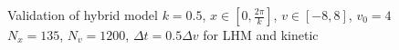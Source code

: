 \documentclass{beamer}
\begin{document}
\begin{frame}{Validation of hybrid model}
  $k=0.5$, $x\in[0,\frac{2\pi}{k}]$, $v\in[-8,8]$, $v_0 = 4$ \\
  $N_x = 135$, $N_v = 1200$, $\Delta t = 0.5\Delta v$ for LHM and kinetic
\end{frame}
\end{document}
